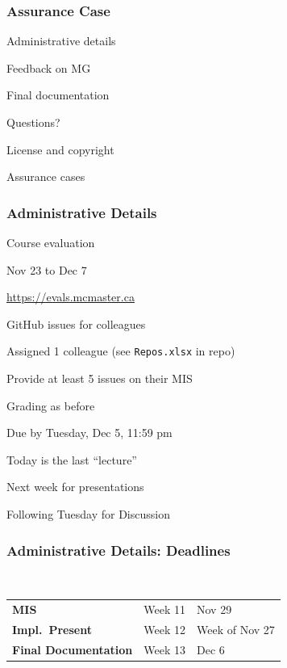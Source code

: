 \documentclass[t,12pt,numbers,fleqn]{beamer}
\begin{document}



\begin{frame}
\frametitle{Assurance Case}

\bi
\item Administrative details
\item Feedback on MG
\item Final documentation
\item Questions?
\item License and copyright
\item Assurance cases
\ei
\end{frame}


\begin{frame}
\frametitle{Administrative Details}

\bi
\item Course evaluation
\bi
\item Nov 23 to Dec 7
\item \url{https://evals.mcmaster.ca}
\ei
\item GitHub issues for colleagues
\bi
\item Assigned 1 colleague (see \texttt{Repos.xlsx} in repo)
\item Provide at least 5 issues on their MIS
\item Grading as before
\item Due by Tuesday, Dec 5, 11:59 pm
\ei
\item Today is the last ``lecture''
\item Next week for presentations
\item Following Tuesday for Discussion
\ei

\end{frame}


\begin{frame}
\frametitle{Administrative Details: Deadlines}
~\newline
\begin{tabular}{l l l}
\textbf{MIS} & Week 11 & Nov 29\\
\textbf{Impl.\ Present} & Week 12 & Week of Nov 27\\
\textbf{Final Documentation} & Week 13 & Dec 6\\
\end {tabular}

\end{frame}
\end{document}
